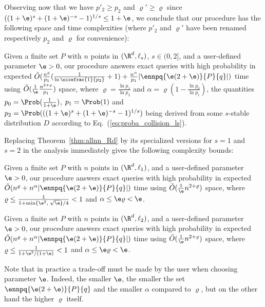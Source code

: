 Observing now that we have $p'_2\geq p_2$ and $\varrho'\geq \varrho$
since $((1+\e)^s+(1+\e)^{-s}-1)^{1/s}\leq 1+\e$, we conclude that our
procedure has the following space and time complexities (where $p'_2$
and $\varrho'$ have been renamed respectively $p_2$ and $\varrho$ for
convenience):
\begin{thm}\label{thm:exact-nn}
  Given a finite set $P$ with $n$ points in $(\R^d,\ell_s)$, $s\in
  (0,2]$, and a user-defined parameter $\e> 0$, our procedure
    answers exact \nn queries with high probability in expected
    $\tilde O(\frac{n^\varrho}{p_1}(\frac{1}{\ln\nicefrac{1}{p_2}}+1)
    + \frac{n^\alpha}{p_1} |\ennpq{\e(2+\e)}{P}{q}|)$ time using $\tilde
    O(\frac{1}{\e}\frac{n^{2+\varrho}}{p_1})$ space, where $\varrho=\frac{\ln
      p_1}{\ln p_2}$ and $\alpha=\varrho(1-\frac{\ln p_0}{\ln p_1})$,
    the quantities $p_0=\Prob(\frac{1}{1+\e})$, $p_1=\Prob(1)$ and
    $p_2=\Prob(((1+\e)^s+(1+\e)^{-s}-1)^{1/s})$ being derived from some
    $s$-stable distribution $D$ according to
    Eq.~(\ref{eq:proba_collision_ls}).
\end{thm}
Replacing Theorem~\ref{thm:allnn_Rd} by its specialized versions for
$s=1$ and $s=2$ in the analysis immediately gives the following complexity
bounds:
\addtocounter{thm}{-1}
\begin{thm}[case $s=1$]\label{thm:exact-nn_l1}
  Given a finite set $P$ with $n$ points in $(\R^d,\ell_1)$, and a
  user-defined parameter $\e> 0$, our procedure answers exact \nn
  queries with high probability in expected $\tilde
  O(n^\varrho + n^\alpha
  |\ennpq{\e(2+\e)}{P}{q}|)$ time using $\tilde
  O(\frac{1}{\e}n^{2+\varrho})$ space, where $\varrho\leq
  \frac{1}{1+\min\{\e^2,\;\sqrt{\e}\}/4}<1$ and $\alpha\leq
  \e\varrho<\e$.
\end{thm}
\addtocounter{thm}{-1}
\begin{thm}[case $s=2$]\label{thm:exact-nn_l2}
  Given a finite set $P$ with $n$ points in $(\R^d,\ell_2)$, and a
  user-defined parameter $\e> 0$, our procedure answers exact \nn
  queries with high probability in expected $\tilde O(n^\varrho +
  n^\alpha |\ennpq{\e(2+\e)}{P}{q}|)$ time using $\tilde
  O(\frac{1}{\e}n^{2+\varrho})$ space, where $\varrho\leq
  \frac{1}{1+\e^2/(1+\e)}<1$ and $\alpha\leq
  \e\varrho<\e$.
\end{thm}

Note that in practice a trade-off must be made by the user when
choosing parameter $\e$. Indeed, the smaller $\e$, the smaller
the set $\ennpq{\e(2+\e)}{P}{q}$ and the smaller $\alpha$ compared to
$\varrho$, but on the other hand the higher $\varrho$ itself.

